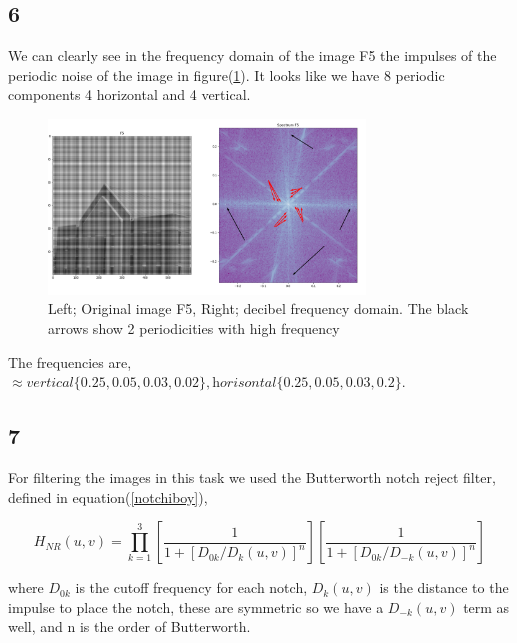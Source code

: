 {\subsection{6}


We can clearly see in the frequency domain of the image F5 the impulses of the periodic noise of the image in figure(\ref{F5period}). It looks like we have 8 periodic components 4 horizontal and 4 vertical.


\begin{figure}[!htb]
    {\centering
        \includegraphics[width=0.75\textwidth]{superpositionfreq.png}
        \caption{Left; Original image F5, Right; decibel frequency domain. The black arrows show 2 periodicities with high frequency}
        \label{F5period}
    \par}
    \end{figure}


The frequencies are, $\approx \textit{vertical}\{0.25, 0.05, 0.03, 0.02\}, \textit{horisontal}\{0.25, 0.05, 0.03, 0.2\}$.





\subsection{7}


For filtering the images in this task we used the Butterworth notch reject filter, defined in equation(\ref{notchiboy}),

\begin{equation}
    H_{NR}(u,v) = \prod_{k=1}^{3}\left[\frac{1}{1+[D_{0k}/D_{k}(u,v)]^{n}} \right]\left[\frac{1}{1+[D_{0k}/D_{-k}(u,v)]^{n}} \right]
    \label{notchiboy}
\end{equation}

where $D_{0k}$ is the cutoff frequency for each notch, $D_{k}(u,v)$ is the distance to the impulse to place the notch, these are symmetric so we have a $D_{-k}(u,v)$ term as well, and n is the order of Butterworth.

}
